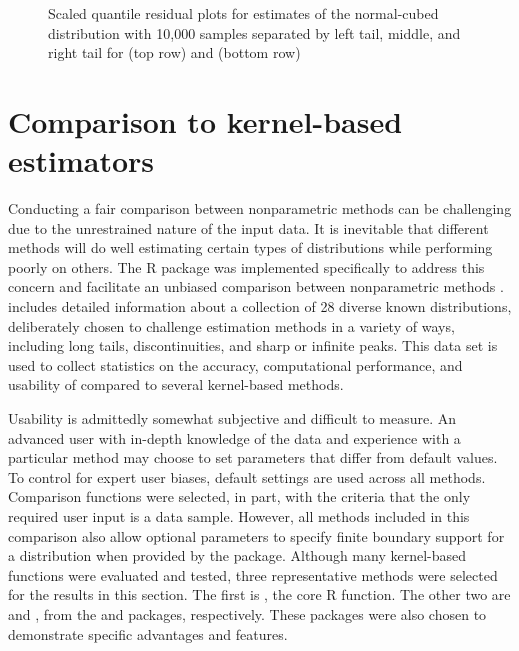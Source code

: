 \begin{figure}[tbp]
\begin{tabular}{p{} p{}p{}}
\end{tabular}
\caption{\label{fig:normalcubed2} Scaled quantile residual plots for estimates of the normal-cubed distribution with 10,000 samples separated by left tail, middle, and right tail for  (top row) and  (bottom row)}
\end{figure}

\section{Comparison to kernel-based estimators} \label{sec:comparison}

Conducting a fair comparison between nonparametric methods can be challenging due to the unrestrained nature of the input data. It is inevitable that different methods will do well estimating certain types of distributions while performing poorly on others.  The  R package was implemented specifically to address this concern and facilitate an unbiased comparison between nonparametric methods \citep{benchden}.  includes detailed information about a collection of 28 diverse known distributions, deliberately chosen to challenge estimation methods in a variety of ways, including long tails, discontinuities, and sharp or infinite peaks.  This data set is used to collect statistics on the accuracy, computational performance, and usability of  compared to several kernel-based methods.

Usability is admittedly somewhat subjective and difficult to measure.  An advanced user with in-depth knowledge of the data and experience with a particular method may choose to set parameters that differ from default values.  To control for
expert user biases, default settings are used across all methods.  Comparison functions were selected, in part, with the criteria that the only required user input is a data sample. However, all methods included in this comparison also allow optional parameters to specify finite boundary support for a distribution when provided by the  package.  Although many kernel-based functions were evaluated and tested, three representative methods were selected for the results in this section.  The first is , the core R function. The other two are  and , from the  \citep{kdeR2} and  \citep{kernsmooth} packages, respectively.  These packages were also chosen to demonstrate specific advantages and features. 

